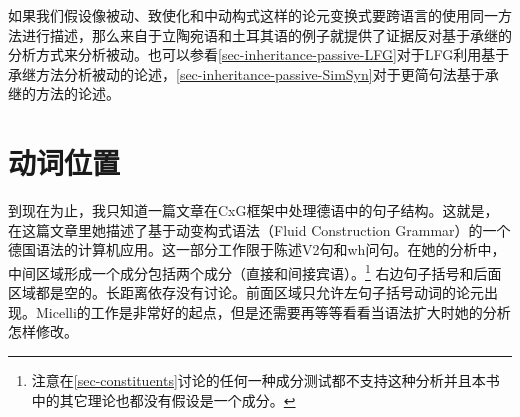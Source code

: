 如果我们假设像被动、致使化和中动构式这样的论元变换式要跨语言的使用同一方法进行描述，那么来自于立陶宛语和土耳其语的例子就提供了证据反对基于承继的分析方式来分析被动\citep{Mueller2006d,Mueller2007d,MWArgSt}。也可以参看\ref{sec-inheritance-passive-LFG}对于LFG利用基于承继方法分析被动的论述，\ref{sec-inheritance-passive-SimSyn}对于更简句法基于承继的方法的论述。

\section{动词位置}

\addlines
到现在为止，我只知道一篇文章在CxG框架中处理德语中的句子结构。这就是\citeyearpar{Micelli2012a}，在这篇文章里她描述了基于动变构式语法\indexfcgc（Fluid Construction Grammar）的一个德国语法的计算机应用。这一部分工作限于陈述V2句和wh问句。在她的分析中，中间区域形成一个成分包括两个成分（直接和间接宾语）。\footnote{
  注意在\ref{sec-constituents}讨论的任何一种成分测试都不支持这种分析并且本书中的其它理论也都没有假设\mf 是一个成分。%
} 右边句子括号和后面区域都是空的。长距离依存没有讨论。前面区域只允许左句子括号动词的论元出现。Micelli的工作是非常好的起点，但是还需要再等等看看当语法扩大时她的分析怎样修改。

